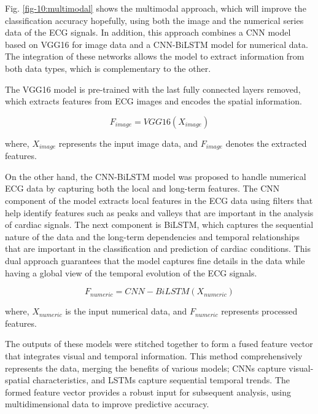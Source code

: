 \documentclass[conference]{IEEEtran}
\begin{document}
Fig. \ref{fig-10:multimodal} shows the multimodal approach, which will improve the classification accuracy hopefully, using both the image and the numerical series data of the ECG signals. In addition, this approach combines a CNN model based on VGG16 for image data and a CNN-BiLSTM model for numerical data. The integration of these networks allows the model to extract information from both data types, which is complementary to the other.

The VGG16 model is pre-trained with the last fully connected layers removed, which extracts features from ECG images and encodes the spatial information.

\begin{equation}
F_{image} = VGG16(X_{image})    
\end{equation}

where, \( X_{image} \) represents the input image data, and \( F_{image} \) denotes the extracted features.

On the other hand, the CNN-BiLSTM model was proposed to handle numerical ECG data by capturing both the local and long-term features. The CNN component of the model extracts local features in the ECG data using filters that help identify features such as peaks and valleys that are important in the analysis of cardiac signals. The next component is BiLSTM, which captures the sequential nature of the data and the long-term dependencies and temporal relationships that are important in the classification and prediction of cardiac conditions. This dual approach guarantees that the model captures fine details in the data while having a global view of the temporal evolution of the ECG signals.

\begin{equation}
F_{numeric} = CNN-BiLSTM(X_{numeric})   
\end{equation}



where, \( X_{numeric} \) is the input numerical data, and \( F_{numeric} \) represents processed features.

The outputs of these models were stitched together to form a fused feature vector that integrates visual and temporal information. This method comprehensively represents the data, merging the benefits of various models; CNNs capture visual-spatial characteristics, and LSTMs capture sequential temporal trends. The formed feature vector provides a robust input for subsequent analysis, using multidimensional data to improve predictive accuracy.
\end{document}
